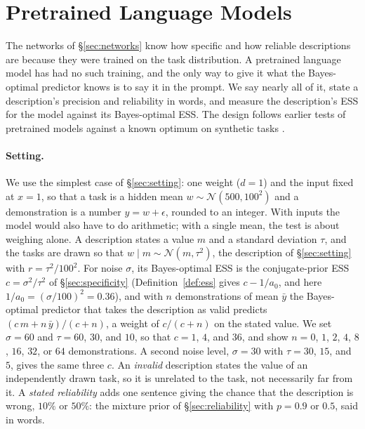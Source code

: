 \documentclass{article}
\begin{document}
\section{Pretrained Language Models}\label{sec:llm}
The networks of \S\ref{sec:networks} know how specific and how reliable descriptions are because they were trained on the task distribution. A pretrained language model has had no such training, and the only way to give it what the Bayes-optimal predictor knows is to say it in the prompt. We say nearly all of it, state a description's precision and reliability in words, and measure the description's ESS for the model against its Bayes-optimal ESS. The design follows earlier tests of pretrained models against a known optimum on synthetic tasks \citep{gupta2025, akata2026}.

\paragraph{Setting.} We use the simplest case of \S\ref{sec:setting}: one weight ($d = 1$) and the input fixed at $x = 1$, so that a task is a hidden mean $w \sim \mathcal{N}(500, 100^2)$ and a demonstration is a number $y = w + \epsilon$, rounded to an integer. With inputs the model would also have to do arithmetic; with a single mean, the test is about weighing alone. A description states a value $m$ and a standard deviation $\tau$, and the tasks are drawn so that $w \mid m \sim \mathcal{N}(m, \tau^2)$, the description of \S\ref{sec:setting} with $r = \tau^2 / 100^2$. For noise $\sigma$, its Bayes-optimal ESS is the conjugate-prior ESS $c = \sigma^2 / \tau^2$ of \S\ref{sec:specificity} (Definition~\ref{def:ess} gives $c - 1/a_0$, and here $1/a_0 = (\sigma/100)^2 = 0.36$), and with $n$ demonstrations of mean $\bar y$ the Bayes-optimal predictor that takes the description as valid predicts $(c\,m + n\,\bar y)/(c + n)$, a weight of $c/(c+n)$ on the stated value. We set $\sigma = 60$ and $\tau = 60$, $30$, and $10$, so that $c = 1$, $4$, and $36$, and show $n = 0$, $1$, $2$, $4$, $8$, $16$, $32$, or $64$ demonstrations. A second noise level, $\sigma = 30$ with $\tau = 30$, $15$, and $5$, gives the same three $c$. An \emph{invalid} description states the value of an independently drawn task, so it is unrelated to the task, not necessarily far from it. A \emph{stated reliability} adds one sentence giving the chance that the description is wrong, $10\%$ or $50\%$: the mixture prior of \S\ref{sec:reliability} with $p = 0.9$ or $0.5$, said in words.
\end{document}
